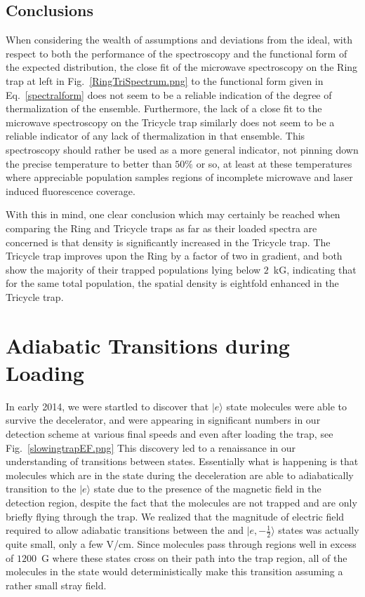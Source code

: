 \documentclass[defaultstyle,11pt]{thesis}
\begin{document}
\subsection{Conclusions}

When considering the wealth of assumptions and deviations from the ideal, with respect to both the performance of the spectroscopy and the functional form of the expected distribution, the close fit of the microwave spectroscopy on the Ring trap at left in Fig.~\ref{RingTriSpectrum.png} to the functional form given in Eq.~\ref{spectralform} does not seem to be a reliable indication of the degree of thermalization of the ensemble.
Furthermore, the lack of a close fit to the microwave spectroscopy on the Tricycle trap similarly does not seem to be a reliable indicator of any lack of thermalization in that ensemble.
This spectroscopy should rather be used as a more general indicator, not pinning down the precise temperature to better than $50\%$ or so, at least at these temperatures where appreciable population samples regions of incomplete microwave and laser induced fluorescence coverage.

With this in mind, one clear conclusion which may certainly be reached when comparing the Ring and Tricycle traps as far as their loaded spectra are concerned is that density is significantly increased in the Tricycle trap.
The Tricycle trap improves upon the Ring by a factor of two in gradient, and both show the majority of their trapped populations lying below $2$~kG, indicating that for the same total population, the spatial density is eightfold enhanced in the Tricycle trap.

\section{Adiabatic Transitions during Loading}
\label{loadingtransitions}

In early 2014, we were startled to discover that $|e\rangle$ state molecules were able to survive the decelerator, and were appearing in significant numbers in our detection scheme at various final speeds and even after loading the trap, see Fig.~\ref{slowingtrapEF.png}
This discovery led to a renaissance in our understanding of transitions between states.
Essentially what is happening is that molecules which are in the  state during the deceleration are able to adiabatically transition to the $|e\rangle$ state due to the presence of the magnetic field in the detection region, despite the fact that the molecules are not trapped and are only briefly flying through the trap.
We realized that the magnitude of electric field required to allow adiabatic transitions between the  and $|e,-\frac{1}{2}\rangle$ states was actually quite small, only a few V/cm.
Since molecules pass through regions well in excess of $1200$~G where these states cross on their path into the trap region, all of the molecules in the  state would deterministically make this transition assuming a rather small stray field.
\end{document}
